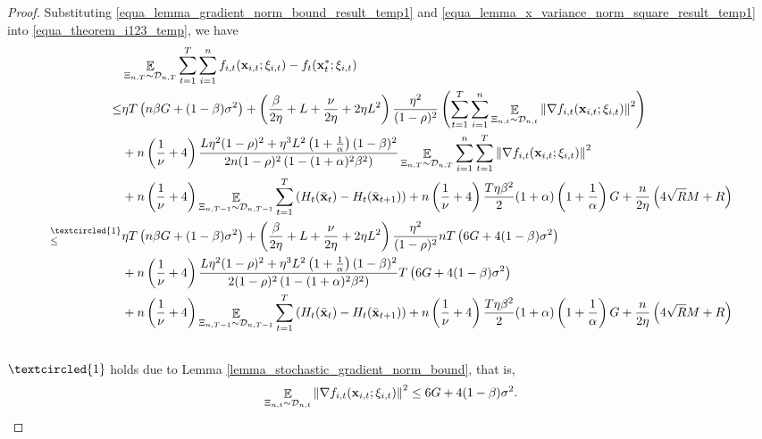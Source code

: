 \documentclass{article}
\begin{document}
\begin{proof}
Substituting \eqref{equa_lemma_gradient_norm_bound_result_temp1} and \eqref{equa_lemma_x_variance_norm_square_result_temp1} into \eqref{equa_theorem_i123_temp}, we have
\begin{align}
\nonumber
& \EE_{ \Xi_{n,T} \sim \Dcal_{n,T} } \sum_{t=1}^T\sum_{i=1}^n f_{i,t}(\x_{i,t};\xi_{i,t}) - f_t(\x_t^\ast;\xi_{i,t}) \\ \nonumber
\le & \eta T \lrincir{ n\beta G + (1-\beta)\sigma^2} + \lrincir{\frac{\beta}{2\eta } +L + \frac{\nu}{2\eta} + 2\eta L^2 } \frac{\eta^2}{(1-\rho)^2} \lrincir{  \sum_{t=1}^T \sum_{i=1}^n \EE_{ \Xi_{n,t} \sim \Dcal_{n,t} } \lrnorm{\nabla f_{i,t}(\x_{i,t}; \xi_{i,t})}^2 }  \\ \nonumber
& + n\lrincir{ \frac{1}{\nu} + 4 } \frac{L \eta^2(1-\rho)^2 + \eta^3 L^2\lrincir{1+\frac{1}{\alpha}}(1-\beta)^2}{2n(1-\rho)^2 \lrincir{1-(1+\alpha)^2\beta^2} }  \EE_{ \Xi_{n,T} \sim \Dcal_{n,T} }\sum_{i=1}^n \sum_{t=1}^T\lrnorm{ \nabla f_{i,t}(\x_{i,t};\xi_{i,t})}^2 \\ \nonumber 
& + n\lrincir{ \frac{1}{\nu} + 4 }\EE_{ \Xi_{n,T-1} \sim \Dcal_{n,T-1} } \sum_{t=1}^T \lrincir{ H_t(\bar{\x}_t) -  H_t(\bar{\x}_{t+1}) } +  n\lrincir{ \frac{1}{\nu} + 4 }\frac{T\eta \beta^2}{2} (1+\alpha) \lrincir{1+\frac{1}{\alpha}}  G  + \frac{n}{2\eta}\lrincir{ 4\sqrt{R}M + R  } \\ \nonumber
\refabovecir{\le}{\textcircled{1}} & \eta T \lrincir{ n\beta G + (1-\beta)\sigma^2} + \lrincir{\frac{\beta}{2\eta } +L + \frac{\nu}{2\eta} + 2\eta L^2 } \frac{\eta^2}{(1-\rho)^2} nT\lrincir{6G  + 4 (1-\beta)\sigma^2}  \\ \nonumber
& + n\lrincir{ \frac{1}{\nu} + 4 } \frac{L \eta^2(1-\rho)^2 + \eta^3 L^2\lrincir{1+\frac{1}{\alpha}}(1-\beta)^2}{2(1-\rho)^2 \lrincir{1-(1+\alpha)^2\beta^2} }  T\lrincir{6G  + 4 (1-\beta)\sigma^2} \\ \nonumber 
& + n\lrincir{ \frac{1}{\nu} + 4 }\EE_{ \Xi_{n,T-1} \sim \Dcal_{n,T-1} } \sum_{t=1}^T \lrincir{ H_t(\bar{\x}_t) -  H_t(\bar{\x}_{t+1}) } +  n\lrincir{ \frac{1}{\nu} + 4 }\frac{T\eta \beta^2}{2} (1+\alpha) \lrincir{1+\frac{1}{\alpha}}  G  + \frac{n}{2\eta}\lrincir{ 4\sqrt{R}M + R  } \\ \nonumber
\end{align} $\textcircled{1}$ holds due to Lemma \ref{lemma_stochastic_gradient_norm_bound}, that is, 
\begin{align}
\nonumber
\mathop{\mathbb{E}}_{ \Xi_{n,t} \sim \mathcal{D}_{n,t} }\left\lVert \nabla f_{i,t}({\bf x}_{i,t};\xi_{i,t})\right\rVert^2 \le 6G  + 4 (1-\beta)\sigma^2.
\end{align}











\end{proof}
\end{document}

